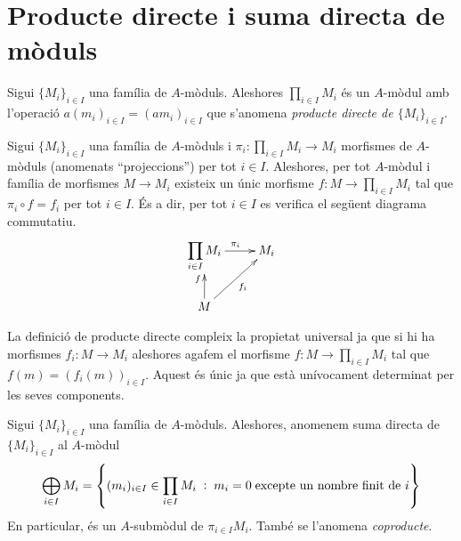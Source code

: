\documentclass[../../../main.tex]{subfiles}
\begin{document}
\section{Producte directe i suma directa de mòduls}


\begin{defi}
\label{def:producteDirecteModuls} Sigui $\{M_i\}_{i\in I}$ una família de $A$-mòduls. Aleshores $\prod_{i\in I}M_i$ és un $A$-mòdul amb l'operació $a(m_i)_{i\in I} = (am_i)_{i\in I}$ que s'anomena \textit{producte directe de $\{M_i\}_{i\in I}$}.
\end{defi}

\begin{prop}
\label{prop:propietatUniversalProducteDirecte} Sigui $\{M_i\}_{i\in I}$ una família de $A$-mòduls i $\pi_i:\prod_{i\in I}M_i\to M_i$ morfismes de $A$-mòduls (anomenats ``projeccions'') per tot $i\in I$. Aleshores, per tot $A$-mòdul i família de morfismes $M\to M_i$ existeix un únic morfisme $f:M\to \prod_{i\in I}M_i$ tal que $\pi_i\circ f = f_i$ per tot $i\in I$. És a dir, per tot $i\in I$ es verifica el següent diagrama commutatiu.
\begin{equation}
    \notag
    \xymatrix{
    \displaystyle\prod_{i\in I}M_i\ar[r]^{\pi_i} & M_i \\
    M\ar[u]^f\ar[ur]_{f_i} &
    }
\end{equation}
\end{prop}

\begin{nota}
La definició de producte directe compleix la propietat universal ja que si hi ha morfismes $f_i:M\to M_i$ aleshores agafem el morfisme $f:M\to \prod_{i\in I}M_i$ tal que $f(m) = (f_i(m))_{i\in I}$. Aquest és únic ja que està unívocament determinat per les seves components.
\end{nota}


\begin{defi}
\label{def:sumaDirectaModuls} Sigui $\{M_i\}_{i\in I}$ una família de $A$-mòduls. Aleshores, anomenem suma directa de $\{M_i\}_{i\in I}$ al $A$-mòdul 
\begin{equation}
    \notag
    \bigoplus_{i\in I}M_i =\left\{(m_i)_{i\in I}\in\prod_{i\in I}M_i\;:\;m_i = 0\;\text{excepte un nombre finit de $i$}\right\}
\end{equation}
En particular, és un $A$-submòdul de $\pi_{i\in I}M_i$. També se l'anomena \textit{coproducte}.
\end{defi}
\end{document}
